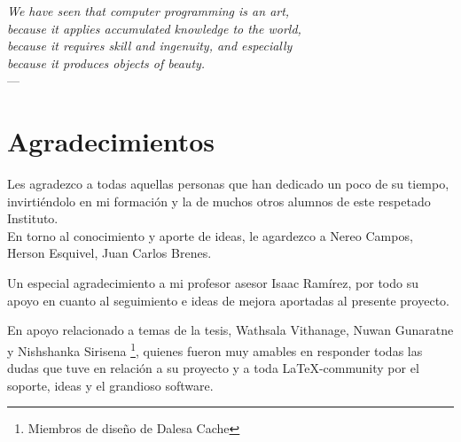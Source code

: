 

\begin{flushright}{\slshape    
We have seen that computer programming is an art, \\ 
because it applies accumulated knowledge to the world, \\ 
because it requires skill and ingenuity, and especially \\
because it produces objects of beauty.} \\ \medskip
---  \citep{knuth:1974}
\end{flushright}

\bigskip


\begingroup

\let\clearpage\relax
\let\cleardoublepage\relax
\let\cleardoublepage\relax

\chapter*{Agradecimientos} %

\noindent Les agradezco a todas aquellas personas que han dedicado un poco de su tiempo, invirtiéndolo en mi formación y la de muchos otros alumnos de este respetado Instituto.\\

\noindent En torno al conocimiento y aporte de ideas, le agardezco a Nereo Campos, Herson Esquivel, Juan Carlos Brenes. 

\noindent Un especial agradecimiento a mi profesor asesor Isaac Ramírez, por todo su apoyo en cuanto al seguimiento e ideas de mejora aportadas al presente proyecto. 

\noindent En apoyo relacionado a temas de la tesis, Wathsala Vithanage, Nuwan Gunaratne y Nishshanka Sirisena \footnote{Miembros de diseño de Dalesa Cache}, quienes fueron muy amables en responder todas las dudas que tuve en relación a su proyecto  y a toda \LaTeX-community por el soporte, ideas y el grandioso software.



\endgroup
